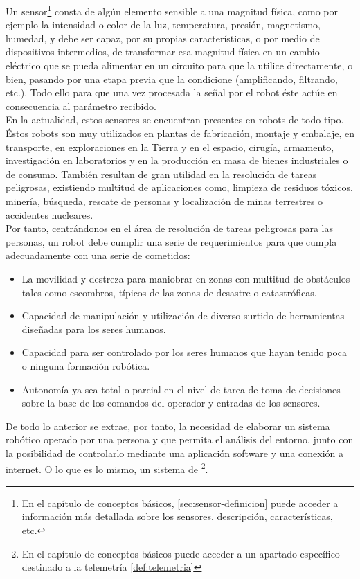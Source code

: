 Un sensor\footnote{En el capítulo de conceptos básicos, \ref{sec:sensor-definicion} puede acceder a información más detallada sobre los sensores, descripción, características, etc.}
consta de algún elemento sensible a una magnitud física, como por ejemplo la intensidad o color de la luz, temperatura, presión, magnetismo, humedad, y debe ser capaz,
por su propias características, o por medio de dispositivos intermedios, de transformar esa magnitud física en un cambio eléctrico que se pueda alimentar en un circuito para
que la utilice directamente, o bien, pasando por una etapa previa que la condicione (amplificando, filtrando, etc.). Todo ello para que una vez procesada la señal por el robot
 éste actúe en consecuencia al parámetro recibido.\\

En la actualidad, estos sensores se encuentran presentes en robots de todo tipo. Éstos robots son muy utilizados en plantas de fabricación, montaje y embalaje, en transporte, en exploraciones en la Tierra y en el espacio, cirugía, armamento, investigación en laboratorios y 
en la producción en masa de bienes industriales o de consumo. También resultan de gran utilidad en la resolución de tareas peligrosas, existiendo multitud de aplicaciones como, 
limpieza de residuos tóxicos, minería, búsqueda, rescate de personas y localización de minas terrestres o accidentes nucleares.\\

Por tanto, centrándonos en el área de resolución de tareas peligrosas para las personas, un robot debe cumplir una serie de requerimientos para que cumpla adecuadamente con una serie 
de cometidos:

\begin{itemize}
 \item La movilidad y destreza para maniobrar en zonas con multitud de obstáculos tales como escombros, típicos de las zonas de desastre o catastróficas.
 \item Capacidad de manipulación y utilización de diverso surtido de herramientas diseñadas para los seres humanos.
 \item Capacidad para ser controlado por los seres humanos que hayan tenido poca o ninguna formación robótica.
 \item Autonomía ya sea total o parcial en el nivel de tarea de toma de decisiones sobre la base de los comandos del operador y entradas de los sensores.
\end{itemize}

De todo lo anterior se extrae, por tanto, la necesidad de elaborar un sistema robótico operado por una persona y que permita el análisis del entorno, junto con la posibilidad de controlarlo mediante una 
aplicación software y una conexión a internet. O lo que es lo mismo, un sistema de \footnote{En el capítulo de conceptos básicos puede acceder a un apartado específico destinado a la telemetría \ref{def:telemetria}}.\\

